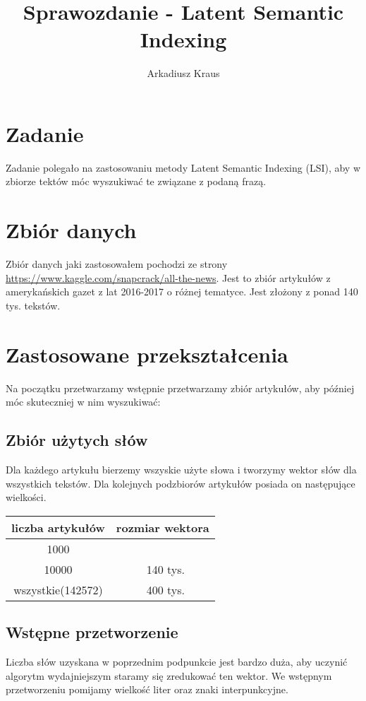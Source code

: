 \documentclass{article}
\begin{document}
\title{Sprawozdanie - Latent Semantic Indexing}
\author{Arkadiusz Kraus}

\maketitle


\section{Zadanie}
Zadanie polegało na zastosowaniu metody Latent Semantic Indexing (LSI), aby w zbiorze tektów móc wyszukiwać te związane z podaną frazą.

\section{Zbiór danych}
Zbiór danych jaki zastosowałem pochodzi ze strony \url{https://www.kaggle.com/snapcrack/all-the-news}. Jest to zbiór artykułów z amerykańskich gazet z lat 2016-2017 o różnej tematyce. Jest złożony z ponad 140 tys. tekstów.

\section{Zastosowane przekształcenia}
Na początku przetwarzamy wstępnie przetwarzamy zbiór artykułów, aby później móc skuteczniej w nim wyszukiwać:
\subsection{Zbiór użytych słów}
Dla każdego artykułu bierzemy wszyskie użyte słowa i tworzymy wektor słów dla wszystkich tekstów. Dla kolejnych podzbiorów artykułów posiada on następujące wielkości.
\begin{center}
	\begin{tabular}{c|c}
	liczba artykułów & rozmiar wektora \\ \hline
	1000 &  \\ \hline
	10000 & ~140 tys.\\ \hline
	wszystkie(142572) & ~400 tys.\\
	\end{tabular}
\end{center}
\subsection{Wstępne przetworzenie}
Liczba słów uzyskana w poprzednim podpunkcie jest bardzo duża, aby uczynić algorytm wydajniejszym staramy się zredukować ten wektor. We wstępnym przetworzeniu pomijamy wielkość liter oraz znaki interpunkcyjne.
\end{document}
